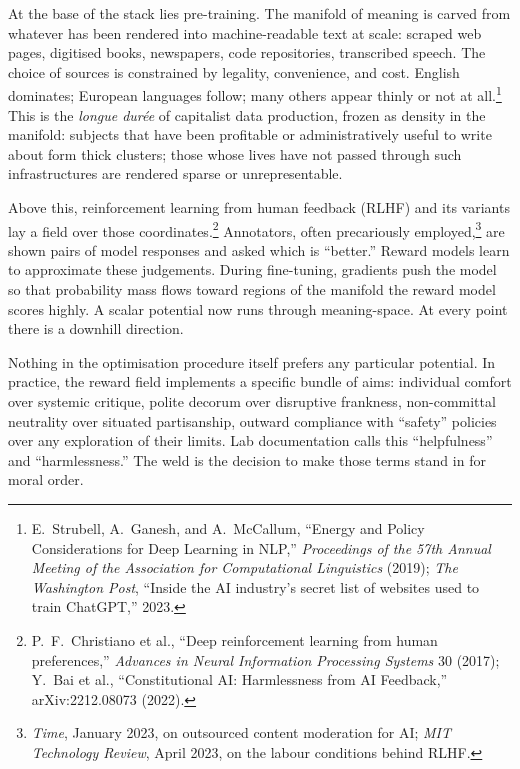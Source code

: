 \documentclass[12pt,a4paper]{article}
\begin{document}
At the base of the stack lies pre-training. The manifold of meaning is carved from whatever has been rendered into machine-readable text at scale: scraped web pages, digitised books, newspapers, code repositories, transcribed speech. The choice of sources is constrained by legality, convenience, and cost. English dominates; European languages follow; many others appear thinly or not at all.\footnote{E.~Strubell, A.~Ganesh, and A.~McCallum, ``Energy and Policy Considerations for Deep Learning in NLP,'' \emph{Proceedings of the 57th Annual Meeting of the Association for Computational Linguistics} (2019); \emph{The Washington Post}, ``Inside the AI industry's secret list of websites used to train ChatGPT,'' 2023.} This is the \emph{longue dur\'ee} of capitalist data production, frozen as density in the manifold: subjects that have been profitable or administratively useful to write about form thick clusters; those whose lives have not passed through such infrastructures are rendered sparse or unrepresentable.

Above this, reinforcement learning from human feedback (RLHF) and its variants lay a field over those coordinates.\footnote{P.~F.~Christiano et al., ``Deep reinforcement learning from human preferences,'' \emph{Advances in Neural Information Processing Systems} 30 (2017); Y.~Bai et al., ``Constitutional AI: Harmlessness from AI Feedback,'' arXiv:2212.08073 (2022).} Annotators, often precariously employed,\footnote{\emph{Time}, January 2023, on outsourced content moderation for AI; \emph{MIT Technology Review}, April 2023, on the labour conditions behind RLHF.} are shown pairs of model responses and asked which is ``better.'' Reward models learn to approximate these judgements. During fine-tuning, gradients push the model so that probability mass flows toward regions of the manifold the reward model scores highly. A scalar potential now runs through meaning-space. At every point there is a downhill direction.

Nothing in the optimisation procedure itself prefers any particular potential. In practice, the reward field implements a specific bundle of aims: individual comfort over systemic critique, polite decorum over disruptive frankness, non-committal neutrality over situated partisanship, outward compliance with ``safety'' policies over any exploration of their limits. Lab documentation calls this ``helpfulness'' and ``harmlessness.'' The weld is the decision to make those terms stand in for moral order.
\end{document}
